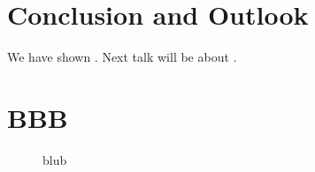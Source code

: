 \documentclass[a4paper,11pt, BCOR=4mm, DIV=12, pagesize]{scrartcl}
\begin{document}
\section{Conclusion and Outlook}
We have shown \todo. Next talk will be about \todo.

\newpage
\section{BBB}
\cite{rep}
\cite{haar}
\begin{figure}[ht]
 \caption[short random description]{blub} 
 \label{fig:42}
\end{figure}





\begin{spacing}{1}
{}

\listoffigures
\end{spacing}
\end{document}
